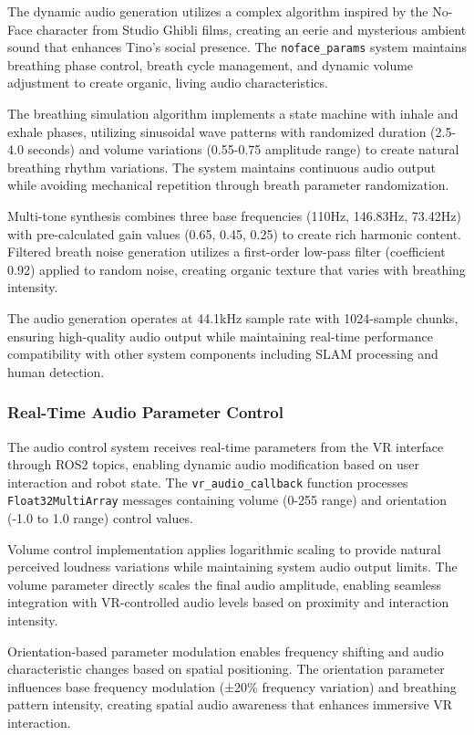 The dynamic audio generation utilizes a complex algorithm inspired by the No-Face character from Studio Ghibli films, creating an eerie and mysterious ambient sound that enhances Tino's social presence. The \texttt{noface\_params} system maintains breathing phase control, breath cycle management, and dynamic volume adjustment to create organic, living audio characteristics.

The breathing simulation algorithm implements a state machine with inhale and exhale phases, utilizing sinusoidal wave patterns with randomized duration (2.5-4.0 seconds) and volume variations (0.55-0.75 amplitude range) to create natural breathing rhythm variations. The system maintains continuous audio output while avoiding mechanical repetition through breath parameter randomization.

Multi-tone synthesis combines three base frequencies (110Hz, 146.83Hz, 73.42Hz) with pre-calculated gain values (0.65, 0.45, 0.25) to create rich harmonic content. Filtered breath noise generation utilizes a first-order low-pass filter (coefficient 0.92) applied to random noise, creating organic texture that varies with breathing intensity.

The audio generation operates at 44.1kHz sample rate with 1024-sample chunks, ensuring high-quality audio output while maintaining real-time performance compatibility with other system components including SLAM processing and human detection.

\subsubsection{Real-Time Audio Parameter Control}

The audio control system receives real-time parameters from the VR interface through ROS2 topics, enabling dynamic audio modification based on user interaction and robot state. The \texttt{vr\_audio\_callback} function processes \texttt{Float32MultiArray} messages containing volume (0-255 range) and orientation (-1.0 to 1.0 range) control values.

Volume control implementation applies logarithmic scaling to provide natural perceived loudness variations while maintaining system audio output limits. The volume parameter directly scales the final audio amplitude, enabling seamless integration with VR-controlled audio levels based on proximity and interaction intensity.

Orientation-based parameter modulation enables frequency shifting and audio characteristic changes based on spatial positioning. The orientation parameter influences base frequency modulation (±20\% frequency variation) and breathing pattern intensity, creating spatial audio awareness that enhances immersive VR interaction.


